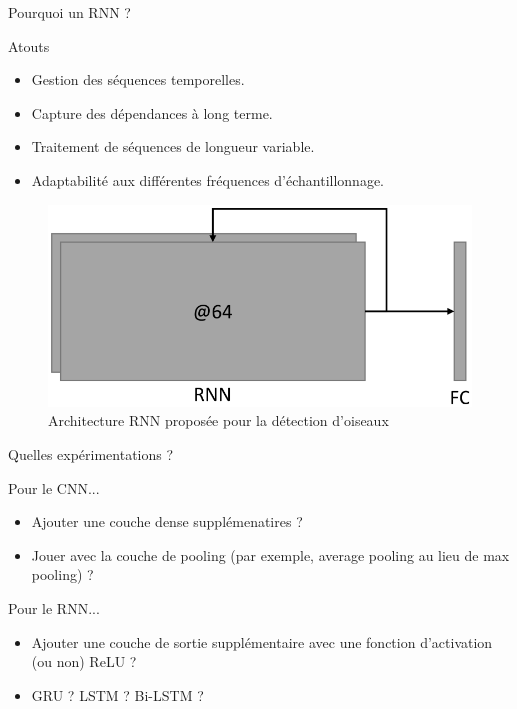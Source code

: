 \documentclass[compress,xcolor=table]{beamer}
\begin{document}
\begin{frame}{Pourquoi un RNN ?}

    \begin{block}{Atouts}
        \begin{itemize}
            \item Gestion des séquences temporelles.
            \item Capture des dépendances à long terme.
            \item Traitement de séquences de longueur variable.
            \item Adaptabilité aux différentes fréquences d'échantillonnage.
        \end{itemize}
    \end{block}

    \begin{figure}
        \includegraphics[height=0.35\textheight,keepaspectratio]{../images/models/RNN.architecture.pdf}
        \caption{Architecture RNN proposée pour la détection d'oiseaux}
        \label{fig:RNN.architecture.birds}
    \end{figure}

\end{frame}

\begin{frame}{Quelles expérimentations ?}
    
    \begin{block}{Pour le CNN...}
        \begin{itemize}
            \item Ajouter une couche dense supplémenatires ?
            \item Jouer avec la couche de pooling (par exemple, average pooling au lieu de max pooling) ?
        \end{itemize}
    \end{block}

    \begin{block}{Pour le RNN...}
        \begin{itemize}
            \item Ajouter une couche de sortie supplémentaire avec une fonction d'activation (ou non) ReLU ?
            \item GRU ? LSTM ? Bi-LSTM ?
        \end{itemize}
    \end{block}

\end{frame}
\end{document}
